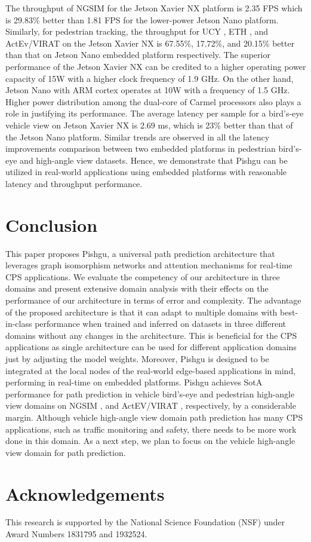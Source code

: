 \documentclass[sigconf]{acmart}
\begin{document}
The throughput of NGSIM for the Jetson Xavier NX platform is 2.35 FPS which is 29.83\% better than 1.81 FPS for the lower-power Jetson Nano platform. Similarly, for pedestrian tracking, the throughput for UCY \cite{pellegrini2009you}, ETH \cite{lerner2007crowds}, and ActEv/VIRAT \cite{awad2018benchmarking} on the Jetson Xavier NX is 67.55\%, 17.72\%, and 20.15\% better than that on Jetson Nano embedded platform respectively. The superior performance of the Jetson Xavier NX can be credited to a higher operating power capacity of 15W with a higher clock frequency of 1.9 GHz. On the other hand, Jetson Nano with ARM cortex operates at 10W with a frequency of 1.5 GHz. Higher power distribution among the dual-core of Carmel processors also plays a role in justifying its performance. The average latency per sample for a bird's-eye vehicle view on Jetson Xavier NX is 2.69 ms, which is 23\% better than that of the Jetson Nano platform. Similar trends are observed in all the latency improvements comparison between two embedded platforms in pedestrian bird's-eye and high-angle view datasets. Hence, we demonstrate that Pishgu can be utilized in real-world applications using embedded platforms with reasonable latency and throughput performance.

 \section{Conclusion}\label{sec:conclusion}
This paper proposes Pishgu, a universal path prediction architecture that leverages graph isomorphism networks and attention mechanisms for real-time CPS applications. We evaluate the competency of our architecture in three domains and present extensive domain analysis with their effects on the performance of our architecture in terms of error and complexity. The advantage of the proposed architecture is that it can adapt to multiple domains with best-in-class performance when trained and inferred on datasets in three different domains without any changes in the architecture. This is beneficial for the CPS applications as single architecture can be used for different application domains just by adjusting the model weights. Moreover, Pishgu is designed to be integrated at the local nodes of the real-world edge-based applications in mind, performing in real-time on embedded platforms. Pishgu achieves SotA performance for path prediction in vehicle bird's-eye and pedestrian high-angle view domains on NGSIM \cite{NGSIM_i80, NGSIM_US101}, and ActEV/VIRAT \cite{awad2018benchmarking}, respectively, by a considerable margin. Although vehicle high-angle view domain path prediction has many CPS applications, such as traffic monitoring and safety, there needs to be more work done in this domain. As a next step, we plan to focus on the vehicle high-angle view domain for path prediction. \section*{Acknowledgements}
This research is supported by the National Science Foundation (NSF) under Award Numbers 1831795 and 1932524. 


\end{document}
